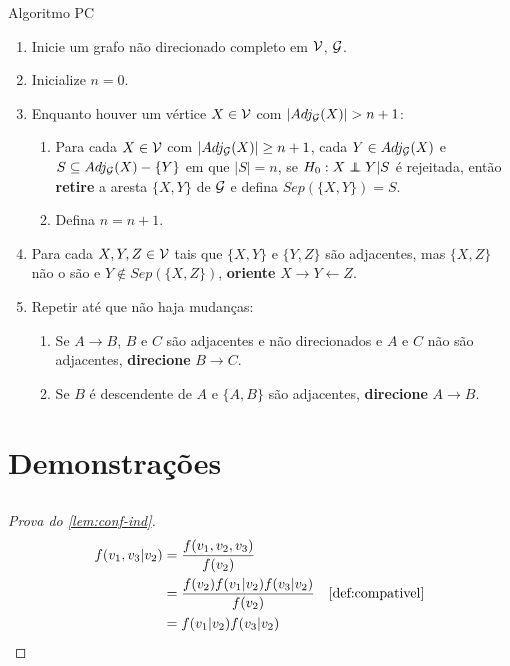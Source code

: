 \begin{algorithm2}
 Algoritmo PC
 \begin{enumerate}
  \item Inicie um grafo não direcionado completo em ${\mathcal V}$, ${\mathcal G}$.
  \item Inicialize $n = 0$.
  \item Enquanto houver um vértice $X \in {\mathcal V}$ com
  $|Adj_{{\mathcal G}}(X)| > n+1$:
  \begin{enumerate}[label=(\alph*)]
   \item Para cada $X \in {\mathcal V}$ com $|Adj_{{\mathcal G}}(X)| \geq n+1$,
   cada $Y \in Adj_{{\mathcal G}}(X)$ e
   $S \subseteq Adj_{{\mathcal G}}(X)-\{Y\}$ em que $|S| = n$,
   se $H_0: X \perp\!\!\!\!\perp Y | S$ é rejeitada, então
   \textbf{retire} a aresta $\{X,Y\}$ de ${\mathcal G}$ e
   defina $Sep(\{X,Y\}) = S$.
   \item Defina $n = n+1$.
  \end{enumerate}
  \item Para cada $X, Y, Z \in {\mathcal V}$ tais que
  $\{X, Y\}$ e $\{Y, Z\}$ são adjacentes, mas
  $\{X, Z\}$ não o são e
  $Y \notin Sep(\{X,Z\})$, \textbf{oriente}
  $X \rightarrow Y \leftarrow Z$.
  \item Repetir até que não haja mudanças:
  \begin{enumerate}[label=(\alph*)]
   \item Se $A \rightarrow B$, 
   $B$ e $C$ são adjacentes e não direcionados e
   $A$ e $C$ não são adjacentes, 
   \textbf{direcione} $B \rightarrow C$.
   \item Se $B$ é descendente de $A$ e 
   $\{A,B\}$ são adjacentes,
   \textbf{direcione} $A \rightarrow B$.
  \end{enumerate}
 \end{enumerate}
\end{algorithm2}




\appendix
\chapter{Demonstrações}

\section{}

\begin{proof}[Prova do \cref{lem:conf-ind}]
 \begin{align*}
  f(v_1,v_3|v_2) 
  &= \frac{f(v_1,v_2,v_3)}{f(v_2)} \\
  &= \frac{f(v_2)f(v_1|v_2)f(v_3|v_2)}{f(v_2)} 
  & \text{\cref{def:compativel}} \\
  &= f(v_1|v_2)f(v_3|v_2)
 \end{align*}
\end{proof}

